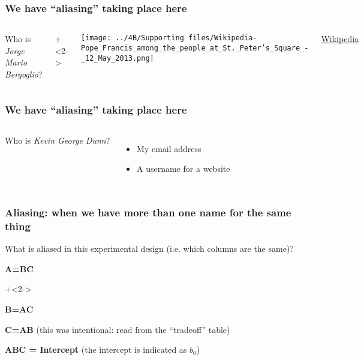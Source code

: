 \begin{frame}\frametitle{We have ``aliasing'' taking place here}
	\begin{columns}
			 Who is \emph{Jorge Mario Bergoglio}?
		
		\onslide+<2->	{
			\texttt{[image: ../4B/Supporting files/Wikipedia-Pope\_Francis\_among\_the\_people\_at\_St.\_Peter's\_Square\_-\_12\_May\_2013.png]}		

			{\scriptsize  \href{https://en.wikipedia.org/wiki/Pope\_Francis}{Wikipedia}}
			}
	\end{columns}
	
\end{frame}

\begin{frame}\frametitle{We have ``aliasing'' taking place here}
	\begin{columns}
		\column{0.48\textwidth}	
			 Who is \emph{Kevin George Dunn}?		

		\column{0.48\textwidth}
			\begin{itemize}
				\item	My email address
				\item	A username for a website
			\end{itemize}
	\end{columns}
	
\end{frame}

\begin{frame}\frametitle{Aliasing: when we have more than one name for the same thing}
	
	\vspace{1cm}
	What is aliased in this experimental design (i.e. which columns are the same)?
		
		\vspace{0.5cm}
		\begin{itemize}
			\item	\textbf{A=BC}
			
			\onslide+<2->	{
			\vspace{1cm}
			\item	\textbf{B=AC}
			
			\vspace{1cm}
			\item	\textbf{C=AB} (this was intentional: read from the ``tradeoff'' table)
			
			\vspace{1cm}
			\item	\textbf{ABC = Intercept} (the intercept is indicated as $b_0$)
			}
		\end{itemize}

\end{frame}

